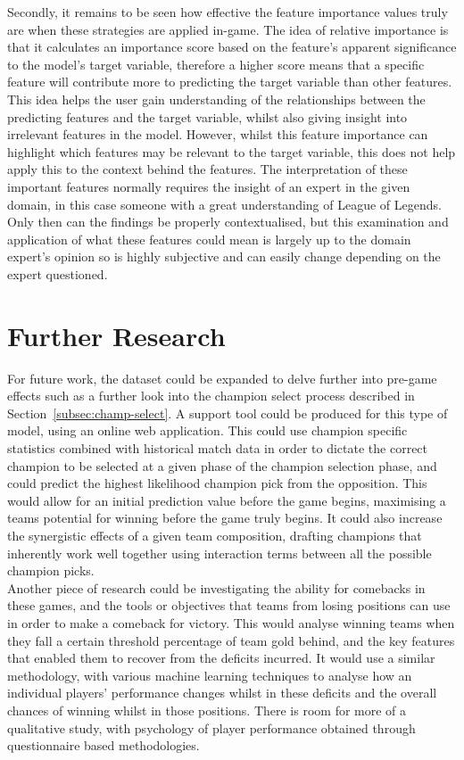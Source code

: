 Secondly, it remains to be seen how effective the feature importance values truly are  when these strategies are applied in-game.
The idea of relative importance is that it calculates an importance score based on the feature's apparent significance to the model's target variable, therefore a higher score means that a specific feature will contribute more to predicting the target variable than other features.
This idea helps the user gain understanding of the relationships between the predicting features and the target variable, whilst also giving insight into irrelevant features in the model.
However, whilst this feature importance can highlight which features may be relevant to the target variable, this does not help apply this to the context behind the features.
The interpretation of these important features normally requires the insight of an expert in the given domain, in this case someone with a great understanding of League of Legends.
Only then can the findings be properly contextualised, but this examination and application of what these features could mean is largely up to the domain expert's opinion so is highly subjective and can easily change depending on the expert questioned.


\section{Further Research}\label{sec:Further Research}

For future work, the dataset could be expanded to delve further into pre-game effects such as a further look into the champion select process described in Section~\ref{subsec:champ-select}.
A support tool could be produced for this type of model, using an online web application.
This could use champion specific statistics combined with historical match data in order to dictate the correct champion to be selected at a given phase of the champion selection phase, and could predict the highest likelihood champion pick from the opposition.
This would allow for an initial prediction value before the game begins, maximising a teams potential for winning before the game truly begins.
It could also increase the synergistic effects of a given team composition, drafting champions that inherently work well together using interaction terms between all the possible champion picks. \\

Another piece of research could be investigating the ability for comebacks in these games, and the tools or objectives that teams from losing positions can use in order to make a comeback for victory.
This would analyse winning teams when they fall a certain threshold percentage of team gold behind, and the key features that enabled them to recover from the deficits incurred.
It would use a similar methodology, with various machine learning techniques to analyse how an individual players' performance changes whilst in these deficits and the overall chances of winning whilst in those positions.
There is room for more of a qualitative study, with psychology of player performance obtained through questionnaire based methodologies. \\

